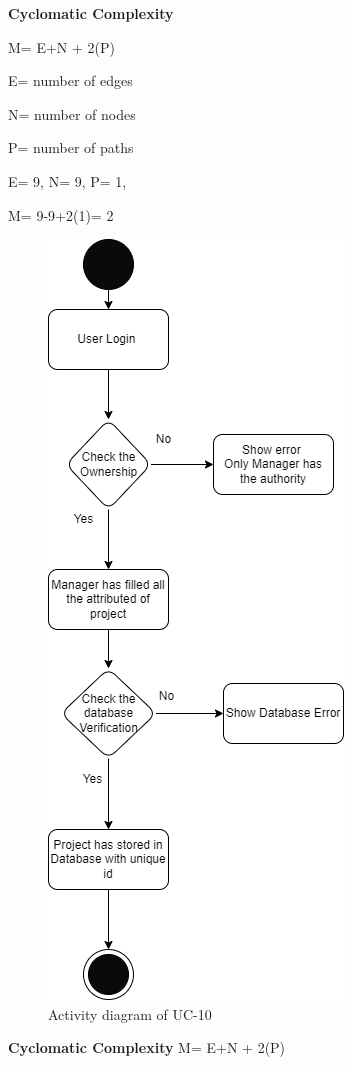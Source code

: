 \textbf{Cyclomatic Complexity}

M= E+N + 2(P)

E= number of edges

N= number of nodes

P= number of paths

E= 9,
N= 9,
P= 1,

M= 9-9+2(1)= 2

\begin{figure}[H]
    \centering
    \includegraphics[scale=0.7]{./diagrams/Activity Diagram/ad-10.png}
    \caption{Activity diagram of UC-10}
    \label{fig:act-10}

\end{figure}


\textbf{Cyclomatic Complexity}
M= E+N + 2(P)

